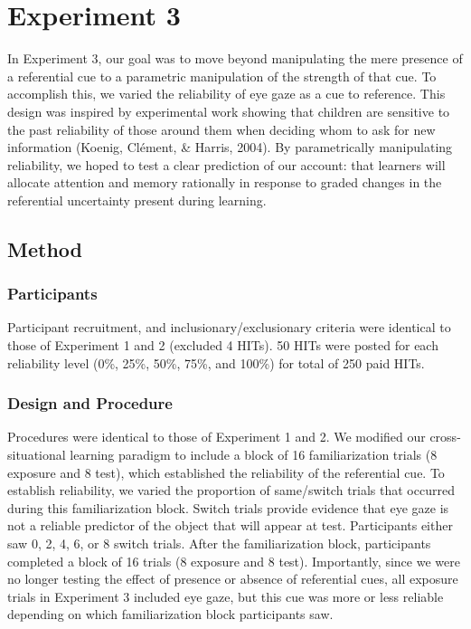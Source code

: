 \documentclass[12pt,]{article}
\begin{document}
\section{Experiment 3}\label{experiment-3}

In Experiment 3, our goal was to move beyond manipulating the mere
presence of a referential cue to a parametric manipulation of the
strength of that cue. To accomplish this, we varied the reliability of
eye gaze as a cue to reference. This design was inspired by experimental
work showing that children are sensitive to the past reliability of
those around them when deciding whom to ask for new information (Koenig,
Cl{é}ment, \& Harris, 2004). By parametrically manipulating reliability,
we hoped to test a clear prediction of our account: that learners will
allocate attention and memory rationally in response to graded changes
in the referential uncertainty present during learning.

\subsection{Method}\label{method-2}

\subsubsection{Participants}\label{participants-2}

Participant recruitment, and inclusionary/exclusionary criteria were
identical to those of Experiment 1 and 2 (excluded 4 HITs). 50 HITs were
posted for each reliability level (0\%, 25\%, 50\%, 75\%, and 100\%) for
total of 250 paid HITs.

\subsubsection{Design and Procedure}\label{design-and-procedure-2}

Procedures were identical to those of Experiment 1 and 2. We modified
our cross-situational learning paradigm to include a block of 16
familiarization trials (8 exposure and 8 test), which established the
reliability of the referential cue. To establish reliability, we varied
the proportion of same/switch trials that occurred during this
familiarization block. Switch trials provide evidence that eye gaze is
not a reliable predictor of the object that will appear at test.
Participants either saw 0, 2, 4, 6, or 8 switch trials. After the
familiarization block, participants completed a block of 16 trials (8
exposure and 8 test). Importantly, since we were no longer testing the
effect of presence or absence of referential cues, all exposure trials
in Experiment 3 included eye gaze, but this cue was more or less
reliable depending on which familiarization block participants saw.
\end{document}
